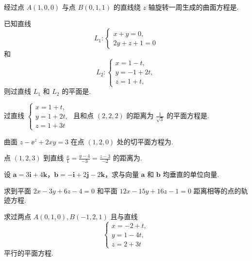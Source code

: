 	\begin{ti}
		经过点 $A(1,0,0)$ 与点 $B(0,1,1)$ 的直线绕 $z$ 轴旋转一周生成的曲面方程是\htwo.
	\end{ti}

	\begin{ti}
		已知直线
		\[
			L_{1}: \begin{cases}
				x + y = 0,\\
				2y + z + 1 = 0
			\end{cases}
		\]
		和
		\[
			L_{2}: \begin{cases}
				x = 1 - t,\\
				y = -1 + 2t,\\
				z = 1 + t,
			\end{cases}
		\]
		则过直线 $L_{1}$ 和 $L_{2}$ 的平面是\htwo.
	\end{ti}

	\begin{ti}
		过直线 $\begin{cases}
			x = 1 + t,\\
			y = 1 + 2t,\\
			z = 1 + 3t
		\end{cases}$ 且和点 $(2,2,2)$ 的距离为 $\frac{1}{\sqrt{3}}$ 的平面方程是\htwo.
	\end{ti}

	\begin{ti}
		曲面 $z - \ee^{z} + 2xy = 3$ 在点 $(1,2,0)$ 处的切平面方程为\htwo.
	\end{ti}

	\begin{ti}
		点 $(1,2,3)$ 到直线 $\frac{x}{1} = \frac{y - 4}{-3} = \frac{z - 3}{-2}$ 的距离为\htwo.
	\end{ti}

	\begin{ti}
		设 $\bm a = 3 \bm i + 4 \bm k$，$\bm b = - \bm i + 2 \bm j - 2 \bm k$，求与向量 $\bm a$ 和 $\bm b$ 均垂直的单位向量.
	\end{ti}

	\begin{ti}
		求到平面 $2x - 3y + 6z - 4 = 0$ 和平面 $12x - 15y + 16z - 1 = 0$ 距离相等的点的轨迹方程.
	\end{ti}

	\begin{ti}
		求过两点 $A(0,1,0), B(-1,2,1)$ 且与直线
		\[
			\begin{cases}
				x = -2 + t,\\
				y = 1 - 4t,\\
				z = 2 + 3t
			\end{cases}
		\]
		平行的平面方程.
	\end{ti}

